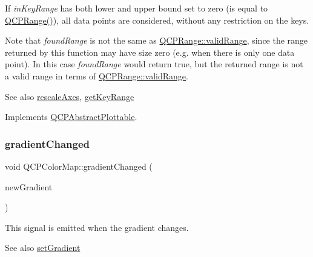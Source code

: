 If {\itshape in\+Key\+Range} has both lower and upper bound set to zero (is equal to {\ttfamily \hyperlink{classQCPRange}{Q\+C\+P\+Range()}}), all data points are considered, without any restriction on the keys.

Note that {\itshape found\+Range} is not the same as \hyperlink{classQCPRange_ab38bd4841c77c7bb86c9eea0f142dcc0}{Q\+C\+P\+Range\+::valid\+Range}, since the range returned by this function may have size zero (e.\+g. when there is only one data point). In this case {\itshape found\+Range} would return true, but the returned range is not a valid range in terms of \hyperlink{classQCPRange_ab38bd4841c77c7bb86c9eea0f142dcc0}{Q\+C\+P\+Range\+::valid\+Range}.

\begin{DoxySeeAlso}{See also}
\hyperlink{classQCPAbstractPlottable_a1491c4a606bccd2d09e65e11b79eb882}{rescale\+Axes}, \hyperlink{classQCPColorMap_a985861974560f950af6cb7fae8c46267}{get\+Key\+Range} 
\end{DoxySeeAlso}


Implements \hyperlink{classQCPAbstractPlottable_a4de773988b21ed090fddd27c6a3a3dcb}{Q\+C\+P\+Abstract\+Plottable}.

\mbox{\label{classQCPColorMap_a31a12726736b1ac274e7b1d8dfb67468}} 
\subsubsection{\texorpdfstring{gradient\+Changed}{gradientChanged}}
{\footnotesize\ttfamily void Q\+C\+P\+Color\+Map\+::gradient\+Changed (\begin{DoxyParamCaption}\item[{const \hyperlink{classQCPColorGradient}{Q\+C\+P\+Color\+Gradient} \&}]{new\+Gradient }\end{DoxyParamCaption})\hspace{0.3cm}{\ttfamily [signal]}}

This signal is emitted when the gradient changes.

\begin{DoxySeeAlso}{See also}
\hyperlink{classQCPColorMap_a7313c78360471cead3576341a2c50377}{set\+Gradient} 
\end{DoxySeeAlso}
\mbox{\label{classQCPColorMap_a856608fa3dd1cc290bcd5f29a5575774}} 
